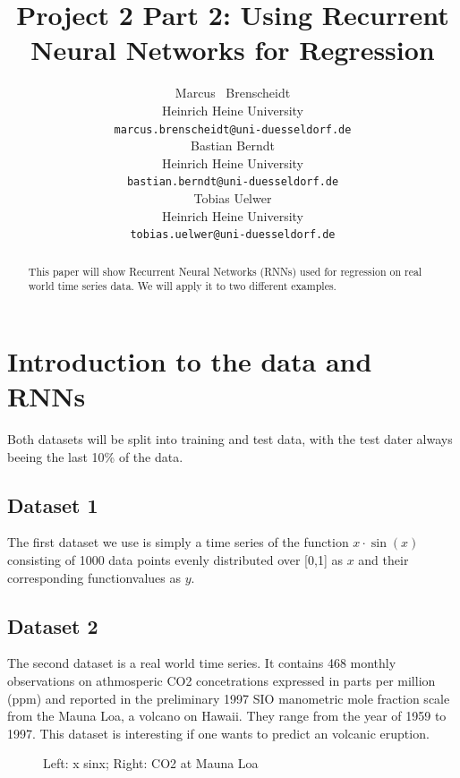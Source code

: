 \documentclass{article}
\title{Project 2 Part 2: Using Recurrent Neural Networks for Regression}
\author{
  Marcus ~Brenscheidt \\
  Heinrich Heine University\\
  \texttt{marcus.brenscheidt@uni-duesseldorf.de} \\
  \And
  Bastian Berndt \\
  Heinrich Heine University\\
  \texttt{bastian.berndt@uni-duesseldorf.de} \\
  \And
  Tobias Uelwer \\
  Heinrich Heine University\\
  \texttt{tobias.uelwer@uni-duesseldorf.de} \\
}
\begin{document}

\maketitle

\begin{abstract}
  This paper will show Recurrent Neural Networks (RNNs) used for regression on real world time series data. We will apply it to two different examples. 
\end{abstract}

\section{Introduction to the data and RNNs}
Both datasets will be split into training and test data, with the test dater always beeing the last 10\% of the data.
\subsection{Dataset 1}
The first dataset we use is simply a time series of the function $x\cdot \sin(x)$ consisting of 1000 data points evenly distributed over [0,1] as $x$ and their corresponding functionvalues as $y$.

\subsection{Dataset 2}
The second dataset is a real world time series. It contains 468 monthly observations on athmosperic CO2 concetrations expressed in parts per million (ppm) and reported in the preliminary 1997 SIO manometric mole fraction scale from the Mauna Loa, a volcano on Hawaii. They range from the year of 1959 to 1997. This dataset is interesting if one wants to predict an volcanic eruption.
\begin{figure}[h]
\centering
{}
\caption{Left: x sinx; Right: CO2 at Mauna Loa}
\end{figure}
\end{document}
